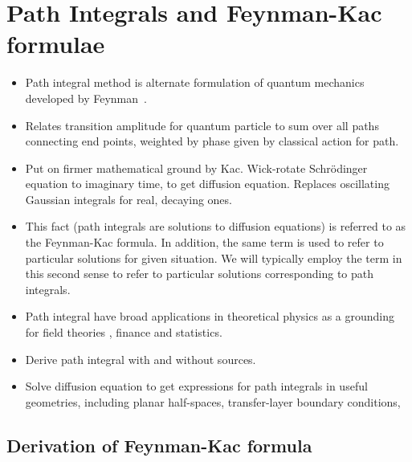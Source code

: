 \chapter{Path Integrals and Feynman-Kac formulae}

\begin{itemize}
  \item Path integral method is alternate formulation of quantum mechanics developed by 
    Feynman~\cite{Feynman1948,Feynman1965}.  
  \item Relates transition amplitude for quantum particle to sum over all paths connecting
    end points, weighted by phase given by classical action for path.  
  \item Put on firmer mathematical ground by Kac.  
    Wick-rotate Schr\"odinger equation to imaginary
    time, to get diffusion equation.
    Replaces oscillating Gaussian integrals for real, decaying ones.
  \item This fact (path integrals are solutions to diffusion equations) is referred to as the 
    Feynman-Kac formula.  
    In addition, the same term is used to refer to particular solutions for given situation.
    We will typically employ the term in this second sense to refer to particular
    solutions corresponding to path integrals.  
  \item Path integral have broad applications in theoretical physics as a grounding for field theories
    \cite{Brown1994}, finance and statistics.
\end{itemize}

\begin{itemize}
  \item Derive path integral with and without sources.
  \item Solve diffusion equation to get expressions for path integrals in useful geometries, 
    including planar half-spaces, transfer-layer boundary conditions, 
\end{itemize}

\section{Derivation of Feynman-Kac formula }

